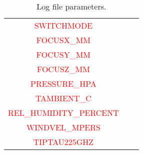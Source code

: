 \documentclass[a4paper,10pt]{article}
\begin{document}
\begin{table}[ht]
\begin{center}
\begin{tabular}{|c|c|c|}
	\textcolor{red}{SWITCHMODE} & &  \\
	\textcolor{red}{FOCUSX\_MM} & &  \\
	\textcolor{red}{FOCUSY\_MM} & &  \\
	\textcolor{red}{FOCUSZ\_MM} & &  \\
	\textcolor{red}{PRESSURE\_HPA} & & \\ 
	\textcolor{red}{TAMBIENT\_C} & &  \\
	\textcolor{red}{REL\_HUMIDITY\_PERCENT} & &  \\
	\textcolor{red}{WINDVEL\_MPERS} & &  \\
	\textcolor{red}{TIPTAU225GHZ} & &  \\
	\hline
	\end{tabular}
	\end{center}
	\caption{Log file parameters.}
	\label{tab:table_log}
	\end{table}
\end{document}
